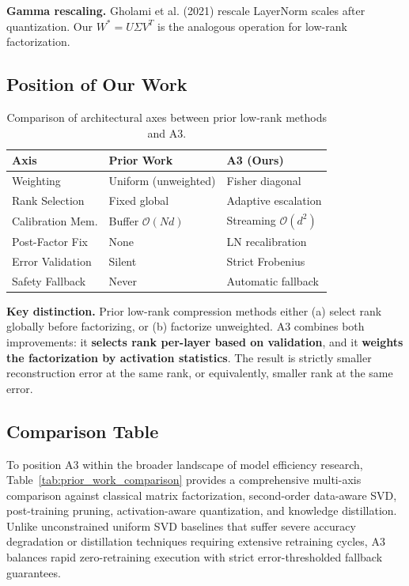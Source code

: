 \textbf{Gamma rescaling.} Gholami et al. (2021) rescale LayerNorm scales after 
quantization. Our $W^* = U \Sigma V^T$ is the analogous operation 
for low-rank factorization.

\subsection{Position of Our Work}

\begin{table}[H]
\centering
\scriptsize
\setlength{\tabcolsep}{3pt}
\begin{tabular}{p{}p{}p{}}
\toprule
\textbf{Axis} & \textbf{Prior Work} & \textbf{A3 (Ours)} \\
\midrule
Weighting & Uniform (unweighted) & Fisher diagonal \\
Rank Selection & Fixed global & Adaptive escalation \\
Calibration Mem. & Buffer $\mathcal{O}(Nd)$ & Streaming $\mathcal{O}(d^2)$ \\
Post-Factor Fix & None & LN recalibration \\
Error Validation & Silent & Strict Frobenius \\
Safety Fallback & Never & Automatic fallback \\
\bottomrule
\end{tabular}
\caption{Comparison of architectural axes between prior low-rank methods and A3.}
\label{tab:positioning}
\end{table}

\textbf{Key distinction.} Prior low-rank compression methods either (a) select 
rank globally before factorizing, or (b) factorize unweighted. A3 combines 
both improvements: it \textbf{selects rank per-layer based on validation}, and it 
\textbf{weights the factorization by activation statistics}. The result is 
strictly smaller reconstruction error at the same rank, or equivalently, 
smaller rank at the same error.

\subsection{Comparison Table}
\label{sec:related_comparison}

To position A3 within the broader landscape of model efficiency research, Table~\ref{tab:prior_work_comparison} provides a comprehensive multi-axis comparison against classical matrix factorization, second-order data-aware SVD, post-training pruning, activation-aware quantization, and knowledge distillation. Unlike unconstrained uniform SVD baselines that suffer severe accuracy degradation or distillation techniques requiring extensive retraining cycles, A3 balances rapid zero-retraining execution with strict error-thresholded fallback guarantees.

